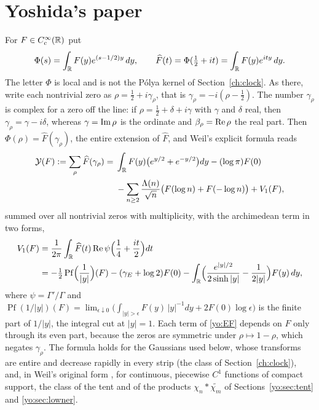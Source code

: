 \section{Yoshida's paper}\label{yo:sec:yoshida}

For $F\in C_c^\infty(\mathbb{R})$ put
\[
\Phi(s)=\int_{\mathbb{R}} F(y)e^{(s-1/2)y}\,dy,\qquad \widehat F(t)=\Phi(\tfrac12+it)=\int_{\mathbb{R}} F(y)e^{ity}\,dy .
\]
The letter $\Phi$ is local and is not the P\'olya kernel of Section~\ref{ch:clock}. As there, write each nontrivial zero as $\rho=\frac12+i\gamma_\rho$, that is $\gamma_\rho=-i(\rho-\frac12)$. The number $\gamma_\rho$ is complex for a zero off the line: if $\rho=\frac12+\delta+i\gamma$ with $\gamma$ and $\delta$ real, then $\gamma_\rho=\gamma-i\delta$, whereas $\gamma=\operatorname{Im}\rho$ is the ordinate and $\beta_\rho=\operatorname{Re}\rho$ the real part. Then $\Phi(\rho)=\widehat F(\gamma_\rho)$, the entire extension of $\widehat F$, and Weil's explicit formula reads
\begin{equation}\label{yo:EF}
\begin{split}
\mathcal Y(F):=\sum_\rho \widehat F(\gamma_\rho)={}&\int_{\mathbb{R}} F(y)\bigl(e^{y/2}+e^{-y/2}\bigr)dy-(\log\pi)F(0)\\
&-\sum_{n\ge2}\frac{\Lambda(n)}{\sqrt n}\bigl(F(\log n)+F(-\log n)\bigr)+V_1(F),
\end{split}
\end{equation}
summed over all nontrivial zeros with multiplicity, with the archimedean term in two forms,
\begin{equation}\label{yo:V1}
\begin{split}
V_1(F)&=\frac1{2\pi}\int_{\mathbb{R}} \widehat F(t)\operatorname{Re}\psi\Bigl(\frac14+\frac{it}2\Bigr)dt\\
&=-\tfrac12\operatorname{Pf}\Bigl(\frac1{|y|}\Bigr)(F)-(\gamma_E+\log2)F(0)-\int_{\mathbb{R}}\Bigl(\frac{e^{|y|/2}}{2\sinh|y|}-\frac1{2|y|}\Bigr)F(y)\,dy ,
\end{split}
\end{equation}
where $\psi=\Gamma'/\Gamma$ and $\operatorname{Pf}(1/|y|)(F)=\lim_{\epsilon\downarrow0}\bigl(\int_{|y|>\epsilon}F(y)\,|y|^{-1}dy+2F(0)\log\epsilon\bigr)$ is the finite part of $1/|y|$, the integral cut at $|y|=1$. Each term of \eqref{yo:EF} depends on $F$ only through its even part, because the zeros are symmetric under $\rho\mapsto1-\rho$, which negates $\gamma_\rho$. The formula holds for the Gaussians used below, whose transforms are entire and decrease rapidly in every strip (the class of Section~\ref{ch:clock}), and, in Weil's original form \cite{Weil52,Bombieri}, for continuous, piecewise $C^1$ functions of compact support, the class of the tent and of the products $\chi_n*\widetilde{\chi_m}$ of Sections~\ref{yo:sec:tent} and \ref{yo:sec:lowner}.

